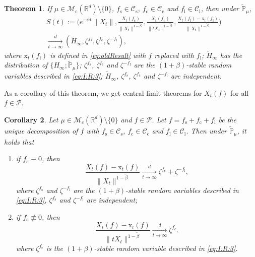 \documentclass[12pt,a4paper]{amsart}
\theoremstyle{plain}
\newtheorem{thm}{Theorem}[section]
\newtheorem{cor}[thm]{Corollary}
\theoremstyle{definition}
\numberwithin{equation}{section}
\begin{document}
\begin{thm}
\label{thm:M}
	If $\mu\in \mathcal M_\mathrm c(\mathbb R^d)\setminus \{0\}$, $f_\mathrm s\in \mathcal C_\mathrm s$, $f_\mathrm c \in \mathcal C_\mathrm c$ and $f_\mathrm l \in \mathcal C_\mathrm l$, then under $\mathbb {\widetilde P}_\mu$,
\begin{align} \label{eq:M.1}
	&S(t):=
	\Bigg(e^{-\alpha t}\|X_t\|, \frac{X_t(f_\mathrm s)}{\|X_t\|^{1-\tilde \beta}},\frac{X_t(f_\mathrm c)}{\|tX_t\|^{1-\tilde \beta}}, \frac{ X_t(f_\mathrm l) - \mathrm x_t(f_\mathrm l)}{\|X_t\|^{1-\tilde \beta}}
	\Bigg)
	\\&\xrightarrow[t\rightarrow \infty]{d}(\widetilde H_\infty,\zeta^{f_\mathrm s},\zeta^{f_\mathrm c},\zeta^{-f_\mathrm l}),
\end{align}
	where $\mathrm x_t(f_\mathrm l)$ is defined in 
	\eqref{eq:oldResult} 
	with $f$ replaced with $f_\mathrm l$;
	$\widetilde H_\infty$ has the distribution of $\{H_{\infty}; \widetilde {\mathbb P}_\mu\}$;
	$\zeta^{f_\mathrm s}$, $\zeta^{f_\mathrm c}$ and $\zeta^{-f_\mathrm l}$ are the $(1+\beta)$-stable random variables described in \eqref{eq:I:R:3};
	$\widetilde H_\infty$,  $\zeta^{f_\mathrm s}$, $\zeta^{f_\mathrm c}$ and $\zeta^{-f_\mathrm l}$ are independent.
\end{thm}

	As a corollary of this theorem, we get  central limit theorems for $X_t(f)$ for all $f\in \mathcal P$.

\begin{cor}
	Let $\mu\in \mathcal M_c(\mathbb R^d)\setminus \{0\}$ and $f\in \mathcal P$.
	Let  $f=f_\mathrm s + f_\mathrm c + f_\mathrm l$ be the unique decomposition of $f$ with $f_\mathrm s \in \mathcal C_\mathrm s$, $f_\mathrm c \in \mathcal C_\mathrm c$ and $f_\mathrm l \in \mathcal C_\mathrm l$.
	Then under $\widetilde {\mathbb{P}}_{\mu}$, it holds that
\begin{enumerate}
\item
	if $f_\mathrm c\equiv 0$, then
\[
    \frac{ X_t(f) - \mathrm x_t(f)}{\|X_t\|^{1-\tilde \beta}}
    \xrightarrow[t\to \infty]{d} \zeta^{f_\mathrm s}+\zeta^{-f_\mathrm l},
\]
	where $\zeta^{f_\mathrm s}$ and $\zeta^{-f_\mathrm l}$ are the $(1+\beta)$-stable random variables described in \eqref{eq:I:R:3}, $\zeta^{f_\mathrm s}$ and $\zeta^{-f_\mathrm l}$ are independent;
\item
if $f_\mathrm c\not\equiv 0$, then
\[
    \frac{ X_t(f) - \mathrm x_t(f)}{\|tX_t\|^{1-\tilde \beta}}
    \xrightarrow[t\to \infty]{d}\zeta^{f_\mathrm c}.
\]
	where $\zeta^{f_\mathrm c}$ is the $(1+\beta)$-stable random variable described in \eqref{eq:I:R:3}.
\end{enumerate}
\end{cor}
\end{document}
